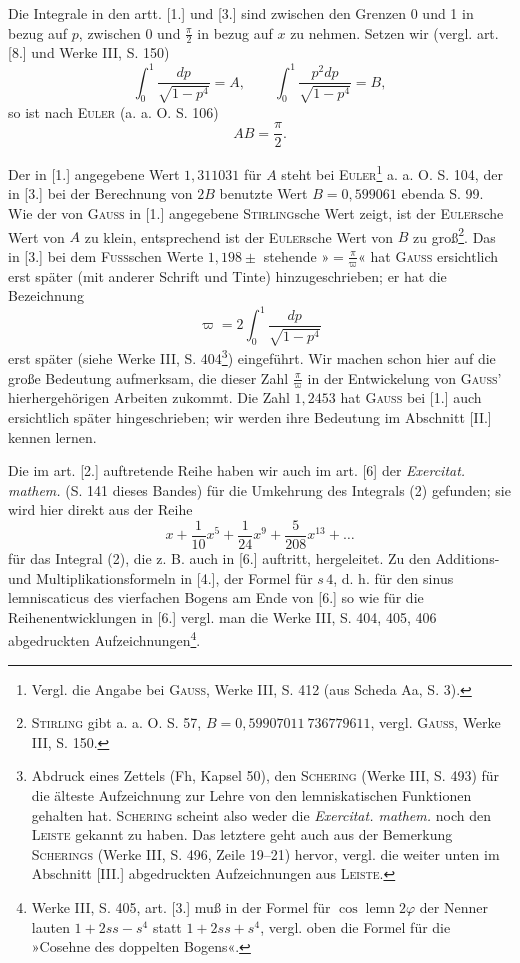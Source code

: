 Die Integrale in den artt. [1.] und [3.] sind zwischen den Grenzen 0 und 1 in bezug auf $p$, zwischen
0 und $\frac\pi2$ in bezug auf $x$ zu nehmen. Setzen wir (vergl. art. [8.] und Werke III, S. 150)
\clearpage
{}
\[\int_0^1\frac{dp}{\sqrt{1-p^4}}=A,\qquad\int_0^1\frac{p^2dp}{\sqrt{1-p^4}}=B,\]
\noindent so ist nach \textsc{Euler} (a. a. O. S. 106)
\begin{equation}AB=\frac\pi2.\tag{3}\end{equation}

Der in [1.] angegebene Wert $1{,}311031$ für $A$ steht bei \textsc{Euler}\renewcommand{\thefootnote}{*)}\footnote{Vergl. die Angabe bei \textsc{Gauss}, Werke III, S. 412 (aus Scheda Aa, S. 3).}
a. a. O. S. 104, der in [3.] bei der Berechnung von $2B$ benutzte Wert $B=0{,}599061$ ebenda S. 99.
Wie der von \textsc{Gauss} in [1.] angegebene \textsc{Stirling}sche Wert zeigt, ist der \textsc{Euler}sche Wert von $A$ zu klein,
entsprechend ist der \textsc{Euler}sche Wert von $B$ zu groß\renewcommand{\thefootnote}{**)}\footnote{\textsc{Stirling} gibt a. a. O. S. 57, $B=0{,}59907011\ 736779611$, vergl. \textsc{Gauss}, Werke III, S. 150.}.
Das in [3.] bei dem \textsc{Fuss}schen Werte $1{,}198\pm$ stehende »$=\frac\pi\varpi$« hat \textsc{Gauss} ersichtlich
erst später (mit anderer Schrift und Tinte) hinzugeschrieben; er hat die Bezeichnung
\[\varpi=2\int_0^1\frac{dp}{\sqrt{1-p^4}}\]
\noindent erst später (siehe Werke III, S. 404\renewcommand{\thefootnote}{***)}\footnote{Abdruck eines Zettels (Fh, Kapsel 50), den \textsc{Schering} (Werke III, S. 493) für die älteste Aufzeichnung zur Lehre von den lemniskatischen Funktionen gehalten hat. \textsc{Schering} scheint also weder die \textit{Exercitat. mathem.} noch den \textsc{Leiste} gekannt zu haben. Das letztere geht auch aus der Bemerkung \textsc{Scherings} (Werke III, S. 496, Zeile 19--21) hervor, vergl. die weiter unten im Abschnitt [III.] abgedruckten Aufzeichnungen aus \textsc{Leiste}.}) eingeführt.
Wir machen schon hier auf die große Bedeutung aufmerksam, die dieser Zahl $\frac\pi\varpi$ in der Entwickelung von \textsc{Gauss}’ hierhergehörigen Arbeiten zukommt.
Die Zahl $1{,}2453$ hat \textsc{Gauss} bei [1.] auch ersichtlich später hingeschrieben; wir werden ihre Bedeutung im Abschnitt [II.] kennen lernen.

Die im art. [2.] auftretende Reihe haben wir auch im art. [6] der \textit{Exercitat. mathem.} (S. 141 dieses Bandes)
für die Umkehrung des Integrals (2) gefunden; sie wird hier direkt aus der Reihe
\[x+\frac1{10}x^5+\frac1{24}x^9+\frac5{208}x^{13}+\ldots\]
\noindent für das Integral (2), die z. B. auch in [6.] auftritt, hergeleitet. Zu den Additions- und Multiplikationsformeln
in [4.], der Formel für $s\,4$, d. h. für den sinus lemniscaticus des vierfachen Bogens am Ende von [6.]
so wie für die Reihenentwicklungen in [6.] vergl. man die Werke III, S. 404, 405, 406 abgedruckten Aufzeichnungen\renewcommand{\thefootnote}{$\dagger$)}\footnote{Werke III, S. 405, art. [3.] muß in der Formel für $\cos\operatorname{lemn}2\varphi$ der Nenner lauten $1+2ss-s^4$ statt $1+2ss+s^4$, vergl. oben die Formel für die »Cosehne des doppelten Bogens«.}.


